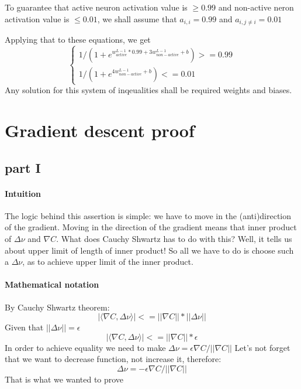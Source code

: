 \documentclass{article}
\begin{document}
To guarantee that active neuron activation value is $\geq 0.99$ and non-active neron activation value is $\leq 0.01$, we shall assume that $a_{i,i} = 0.99$ and $a_{i,j \neq i} = 0.01$

Applying that to these equations, we get
\[
\begin{cases}
1/(1 + e^{w_{active}^{L-1} * 0.99 + 3w_{non-active}^{L-1} + b}) >= 0.99\\
1/(1 + e^{4w_{non-active}^{L-1} + b}) <= 0.01
\end{cases}
\]
Any solution for this system of inqeualities shall be required weights and biases. 

\section{Gradient descent proof}
\subsection{part I}
\paragraph{Intuition}
The logic behind this assertion is simple: we have to move in the (anti)direction of the gradient.
Moving in the direction of the gradient means that inner product of ${\Delta}\nu$ and ${\nabla}C$.
What does Cauchy Shwartz has to do with this? 
Well, it tells us about  upper limit of length of inner product! 
So all we have to do is choose such a ${\Delta}\nu$, as to achieve upper limit of the inner product.
\paragraph{Mathematical notation}
By Cauchy Shwartz theorem:
$$|{\langle}{\nabla}C,{\Delta}\nu{\rangle}| <= ||{\nabla}C||*||{\Delta}\nu||$$
Given that $||{\Delta}\nu|| = \epsilon$
$$|{\langle}{\nabla}C,{\Delta}\nu{\rangle}| <= ||{\nabla}C||*\epsilon$$
In order to achieve equality we need to make ${\Delta}\nu = {\epsilon}{\nabla}C/||{\nabla}C||$
Let's not forget that we want to decrease function, not increase it, therefore:
$${\Delta}\nu = -{\epsilon}{\nabla}C/||{\nabla}C||$$
That is what we wanted to prove
\end{document}
